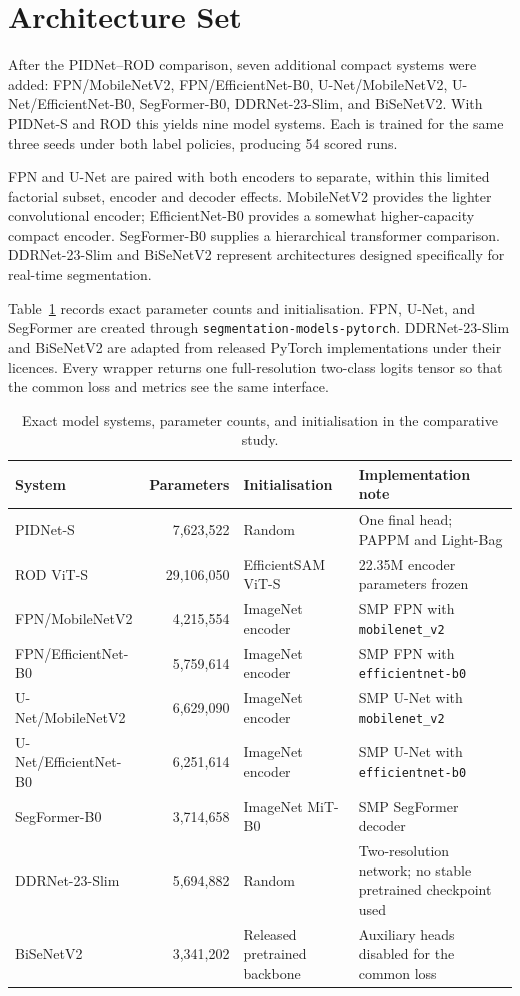 \section{Architecture Set}

After the PIDNet--ROD comparison, seven additional compact systems were added:
FPN/MobileNetV2, FPN/EfficientNet-B0, U-Net/MobileNetV2,
U-Net/EfficientNet-B0, SegFormer-B0, DDRNet-23-Slim, and BiSeNetV2. With
PIDNet-S and ROD this yields nine model systems. Each is trained for the same
three seeds under both label policies, producing 54 scored runs.

FPN and U-Net are paired with both encoders to separate, within this limited
factorial subset, encoder and decoder effects. MobileNetV2 provides the lighter
convolutional encoder; EfficientNet-B0 provides a somewhat higher-capacity
compact encoder. SegFormer-B0 supplies a hierarchical transformer comparison.
DDRNet-23-Slim and BiSeNetV2 represent architectures designed specifically for
real-time segmentation.

Table~\ref{tab:model_implementation_details} records exact parameter counts
and initialisation. FPN, U-Net, and SegFormer are created through
\texttt{segmentation-models-pytorch}. DDRNet-23-Slim and BiSeNetV2 are adapted
from released PyTorch implementations under their licences. Every wrapper
returns one full-resolution two-class logits tensor so that the common loss and
metrics see the same interface.

\begin{table}[H]
\centering
\caption{Exact model systems, parameter counts, and initialisation in the
comparative study.}
\label{tab:model_implementation_details}
\small
\begin{tabularx}{\textwidth}{@{}lrlX@{}}
\toprule
\textbf{System} & \textbf{Parameters} & \textbf{Initialisation} & \textbf{Implementation note} \\
\midrule
PIDNet-S & 7,623,522 & Random & One final head; PAPPM and Light-Bag \\
ROD ViT-S & 29,106,050 & EfficientSAM ViT-S & 22.35M encoder parameters frozen \\
FPN/MobileNetV2 & 4,215,554 & ImageNet encoder & SMP FPN with \texttt{mobilenet\_v2} \\
FPN/EfficientNet-B0 & 5,759,614 & ImageNet encoder & SMP FPN with \texttt{efficientnet-b0} \\
U-Net/MobileNetV2 & 6,629,090 & ImageNet encoder & SMP U-Net with \texttt{mobilenet\_v2} \\
U-Net/EfficientNet-B0 & 6,251,614 & ImageNet encoder & SMP U-Net with \texttt{efficientnet-b0} \\
SegFormer-B0 & 3,714,658 & ImageNet MiT-B0 & SMP SegFormer decoder \\
DDRNet-23-Slim & 5,694,882 & Random & Two-resolution network; no stable pretrained checkpoint used \\
BiSeNetV2 & 3,341,202 & Released pretrained backbone & Auxiliary heads disabled for the common loss \\
\bottomrule
\end{tabularx}
\end{table}

